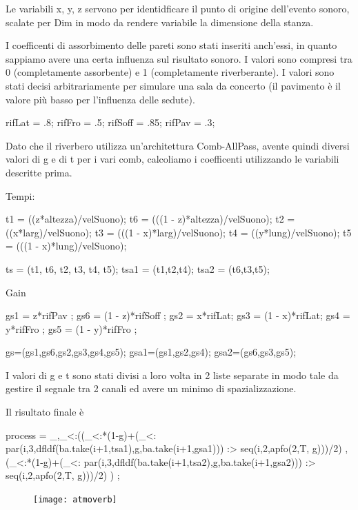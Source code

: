 Le variabili x, y, z servono per identidficare il punto di origine dell'evento sonoro, scalate 
per Dim in modo da rendere variabile la dimensione della stanza.

I coefficenti di assorbimento delle pareti sono stati inseriti anch'essi, in quanto sappiamo
avere una certa influenza sul risultato sonoro. I valori sono compresi tra 0 
(completamente assorbente) e 1 (completamente riverberante). I valori sono stati decisi
arbitrariamente per simulare una sala da concerto (il pavimento è il valore più basso per 
l'influenza delle sedute). 

\begin{code}
rifLat = .8;
rifFro = .5;
rifSoff = .85;
rifPav = .3;
\end{code}

Dato che il riverbero utilizza un'architettura Comb-AllPass, avente quindi diversi valori di g e di t
per i vari comb, calcoliamo i coefficenti utilizzando le variabili descritte prima.

\bigskip

Tempi:
\begin{code}
t1 = ((z*altezza)/velSuono);
t6 = (((1 - z)*altezza)/velSuono);
t2 = ((x*larg)/velSuono);
t3 = (((1 - x)*larg)/velSuono);
t4 = ((y*lung)/velSuono);
t5 = (((1 - x)*lung)/velSuono);

ts = (t1, t6, t2, t3, t4, t5);
tsa1 = (t1,t2,t4);
tsa2 = (t6,t3,t5);
\end{code}

Gain
\begin{code}
gs1 = z*rifPav ; 
gs6 = (1 - z)*rifSoff ;
gs2 = x*rifLat;
gs3 = (1 - x)*rifLat;
gs4 = y*rifFro ;
gs5 = (1 - y)*rifFro ;

gs=(gs1,gs6,gs2,gs3,gs4,gs5);
gsa1=(gs1,gs2,gs4);
gsa2=(gs6,gs3,gs5);
\end{code}

I valori di g e t sono stati divisi a loro volta in 2 liste separate in modo tale da gestire
il segnale tra 2 canali ed avere un minimo di spazializzazione.

Il risultato finale è

\begin{code}
process = _,_<:((_<:*(1-g)+(_<: par(i,3,dfldf(ba.take(i+1,tsa1),g,ba.take(i+1,gsa1))) :> 
seq(i,2,apfo(2,T, g)))/2) ,(_<:*(1-g)+(_<: par(i,3,dfldf(ba.take(i+1,tsa2),g,ba.take(i+1,gsa2))) :> 
seq(i,2,apfo(2,T, g)))/2) ) ;
\end{code}

\begin{figure}[htp]
\centering
\texttt{[image: atmoverb]}
\label{fig:atmoverb}
\end{figure}